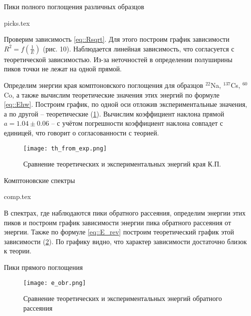 \begin{table}[h]
\begin{center}
  \caption{Пики полного поглощения различных образцов}
  \label{tab:my_label}
  {picks.tex}
\end{center}
\end{table}

Проверим зависимость \eqref{eq::Rsqrt}. Для этого построим график зависимости $R^2 = f(\frac{1}{E})$
(рис. 10). Наблюдается линейная зависимость, что согласуется с теоретической зависимостью. Из-за неточностей в определении
полуширины пиков точки не лежат на одной прямой.

Определим энергии края комптоновского поглощения для образцов $^{22}$Na,
$^{137}$Cs, $^{60}$Co, а также вычислим теоретические значения этих энергий по
формуле \eqref{eq::Ehw}. Построим график, по одной оси отложив экспериментальные
значения, а по другой -- теоретические (\ref{img::th_exp}). Вычислим коэффициент
наклона прямой $a = 1.04 \pm 0.06$ --  с учётом погрешности коэффициент наклона
совпадет с единицей, что говорит о согласованности с теорией.

\begin{figure}[h!]
  \centering
  \texttt{[image: th\_from\_exp.png]}
  \caption{Сравнение теоретических и экспериментальных энергий края К.П.}
  \label{img::th_exp}
\end{figure}

\begin{table}[h!]
  \begin{center}
    \caption{Комптоновские спектры}
    {comp.tex}
  \end{center}
\end{table}

В спектрах, где наблюдаются пики обратного рассеяния, определим энергии этих
пиков и построим график зависимости энергии пика обратного рассеяния от энергии.
Также по формуле \eqref{eq::E_rev} построим теоретический график этой
зависимости (\ref{img::e_obr}).
По графику видно, что характер зависимости достаточно близок к теории.
\begin{table}[h!]
  \centering
  \caption{Пики прямого поглощения}
  
\end{table}


\begin{figure}[h!]
  \centering
  \texttt{[image: e\_obr.png]}
  \caption{Сравнение теоретических и экспериментальных энергий обратного рассеяния}
  \label{img::e_obr}
\end{figure}

